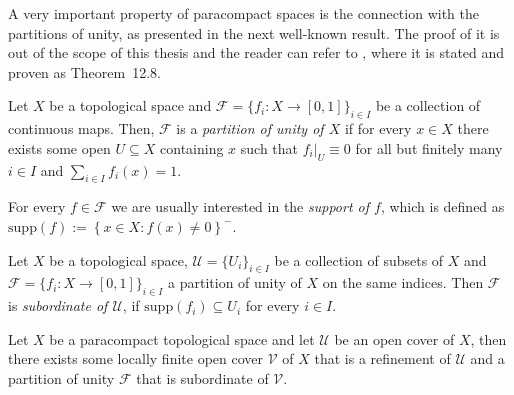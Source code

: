 A very important property of paracompact spaces is the connection with the partitions of unity, as presented in the next well-known result. The proof of it is out of the scope of this thesis and the reader can refer to \cite{bredon}, where it is stated and proven as Theorem~12.8.
\begin{definition} Let $X$ be a topological space and $\mathcal{F}=\{f_i:X\to[0,1]\}_{i\in I}$ be a collection of continuous maps. Then, $\mathcal{F}$ is a \emph{partition of unity of $X$} if for every $x\in X$ there exists some open $U\subseteq X$ containing $x$ such that $f_i|_U\equiv0$ for all but finitely many $i\in I$ and $\sum_{i\in I}f_i(x)=1$.
\end{definition}
\begin{remark} For every $f\in\mathcal{F}$ we are usually interested in the \emph{support of $f$}, which is defined as $\mathrm{supp}(f):=\left\{x\in X:f(x)\neq0\right\}^-$.
\end{remark}
\begin{definition} Let $X$ be a topological space, $\mathcal{U}=\{U_i\}_{i\in I}$ be a collection of subsets of $X$ and $\mathcal{F}=\{f_i:X\to[0,1]\}_{i\in I}$ a partition of unity of $X$ on the same indices. Then $\mathcal{F}$ is \emph{subordinate of $\mathcal{U}$}, if $\mathrm{supp}(f_i)\subseteq U_i$ for every $i\in I$.
\end{definition}
\begin{theorem}\label{thm:paracompact_partition_of_unity} Let $X$ be a paracompact topological space and let $\mathcal{U}$ be an open cover of $X$, then there exists some locally finite open cover $\mathcal{V}$ of $X$ that is a refinement of $\mathcal{U}$ and a partition of unity $\mathcal{F}$ that is subordinate of $\mathcal{V}$.
\end{theorem}

